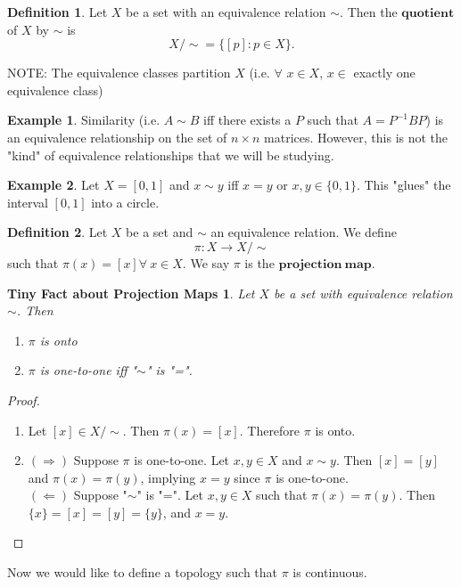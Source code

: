 \documentclass[10pt,reqno]{amsart}
\newtheorem*{Small Fact}{Small Fact}
\newtheorem*{Small Fact about Basis}{Small Fact about Basis}
\newtheorem*{Tiny Fact about Projection Maps}{Tiny Fact about Projection Maps}
\theoremstyle{definition}
\newtheorem*{Definition}{Definition}
\newtheorem{Example}{Example}
\newtheorem{PART II: Creating News Spaces from Old Spaces}{PART II: Creating News Spaces from Old Spaces}
\begin{document}
\begin{Definition}
Let $X$ be a set with an equivalence relation $\sim$. Then the $\mathbf{quotient}$ of $X$ by $\sim$ is 
$$X / \sim = \{ [p] : p \in X\}.$$
\end{Definition}
NOTE: The equivalence classes partition $X$ (i.e. $\forall$ $x \in X$, $x \in$ exactly one equivalence class)

\begin{Example}
Similarity (i.e. $A \sim B$ iff there exists a $P$ such that $A = P^{-1}BP$) is an equivalence relationship on the set of $n \times n$ matrices. However, this is not the "kind" of equivalence relationships that we will be studying.
\end{Example}

\begin{Example}
Let $X = [0,1]$ and $x\sim y$ iff $x = y$ or $x,y \in \{0,1\}$. This "glues" the interval $[0,1]$ into a circle. 
\end{Example}

\begin{Definition}
Let $X$ be a set and $\sim$ an equivalence relation. We define $$\pi: X \rightarrow X / \sim$$ such that $\pi(x) = [x] \forall \ x \in X$. We say $\pi$ is the $\mathbf{projection \ map}$. 
\end{Definition}

\begin{Tiny Fact about Projection Maps}
Let $X$ be a set with equivalence relation $\sim$. Then
\begin{enumerate}
	\item $\pi$ is onto
	\item $\pi$ is one-to-one iff "$\sim$" is "=". 
\end{enumerate}
\end{Tiny Fact about Projection Maps}
\begin{proof}
\begin{enumerate}
	\item Let $[x] \in X / \sim$. Then $\pi(x) = [x]$. Therefore $\pi$ is onto.
	\item $(\Rightarrow)$ Suppose $\pi$ is one-to-one. Let $x,y \in X$ and $x \sim y$. Then $[x] = [y]$ and $\pi(x) = \pi(y)$, implying $x = y$ since $\pi$ is one-to-one.\\
	$(\Leftarrow)$ Suppose "$\sim$" is "=". Let $x,y \in X$ such that $\pi(x) = \pi(y)$. Then $\{x\} = [x] = [y] = \{y\}$, and $x = y$. 
\end{enumerate}
\end{proof}
Now we would like to define a topology such that $\pi$ is continuous. 
\end{document}
